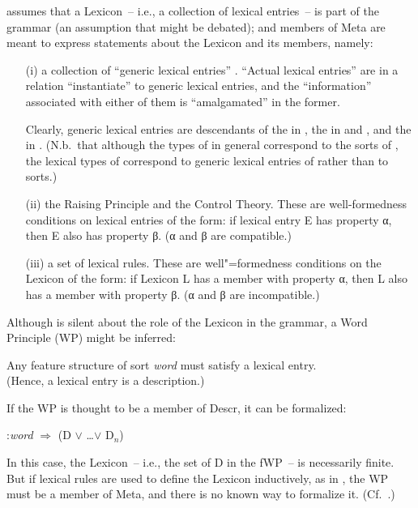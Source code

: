 \documentclass[output=paper]{LSP/langsci}
\begin{document}
\randnum\label{rn:14-4}\citet{PollardSagE1994} assumes that a Lexicon~-- i.e., a collection of lexical entries~--
is part of the grammar (an assumption that might be debated); and
members of \textsf{Meta} are meant to express statements about the Lexicon and
its members, namely:
\enlargethispage{\baselineskip}
\begin{enumerate}
\item[(i)] a collection of ``generic lexical entries''
  \citep[36f.]{PollardSagE1994}. ``Actual lexical entries'' are in a
  relation ``instantiate'' to generic lexical entries, and the
  ``information'' associated with either of them is ``amalgamated'' in the
  former.  

\begin{sloppypar}  
  Clearly, generic lexical entries are descendants of the
   in \citet{Flickingeretal1985}, the
   in \citet{Flickinger1987} and
  \citet{FlickingerNerbonne1992}, and the  in \citet[192--196, 198f.\ and 200--208]{PollardSag1987}. (N.b.\ that although the types of \citealt{PollardSag1987} in general
  correspond to the sorts of \citealt{PollardSagE1994}, the lexical
  types of \citealt{PollardSag1987} correspond to generic lexical entries of
  \citealt{PollardSagE1994} rather than to sorts.)
\end{sloppypar}
\item[(ii)] the Raising Principle and the Control Theory. These are
well-formedness conditions on lexical entries of the form: if
lexical entry E has property α, then E also has property β. (α and β
are compatible.)
\item[(iii)] a set of lexical rules. These are well"=formedness conditions on
the Lexicon of the form: if Lexicon L has a member with property α,
then L also has a member with property β. (α and β are
incompatible.)
\end{enumerate}
\randnum\label{rn:14-5}Although \citet{PollardSagE1994} is silent about the role of the Lexicon in the grammar, a Word Principle (WP) might be inferred:
{
\begin{exe}
Any feature structure of sort \textit{word} must satisfy a lexical
entry. \\ (Hence, a lexical entry is a description.)
\end{exe}
}
If the WP is thought to be a member of \textsf{Descr}, it can be formalized:
\begin{exe}
:\textit{word} $\Rightarrow$ (D $\vee$ \ldots $\vee$ D$_n$)
\end{exe}
In this case, the Lexicon~-- i.e., the set of D in the fWP~-- is necessarily finite. But if lexical rules are used to define the Lexicon inductively, as in \citet[395 n.~1]{PollardSagE1994}, the WP must be a member of \textsf{Meta}, and there is no known way to formalize it. (Cf.\ \citealt{Pollard93}.)
\end{document}
